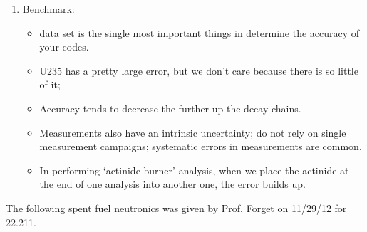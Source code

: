 \documentclass{school-22.211-notes}
\begin{document}
\begin{enumerate}
\item Benchmark: 
  \begin{itemize}
  \item data set is the single most important things in determine the
    accuracy of your codes.
  \item U235 has a pretty large error, but we don't care because there
    is so little of it;
  \item Accuracy tends to decrease the further up the decay chains. 
  \item Measurements also have an intrinsic uncertainty; do not rely
    on single measurement campaigns; systematic errors in measurements
    are common.
  \item In performing `actinide burner' analysis, when we place the
    actinide at the end of one analysis into another one, the error
    builds up.
  \end{itemize}
\end{enumerate} 



\clearpage
{} 


The following spent fuel neutronics was given by Prof. Forget on
11/29/12 for 22.211.
\end{document}

